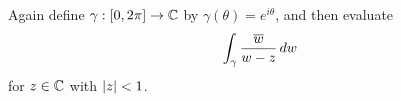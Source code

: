 \documentclass{homework}
\begin{document}
                                                                                      \begin{problem}
                                                                                        Again define $\gamma : [0,2\pi] \to \mathbb{C}$ by
                                                                                          $\gamma(\theta) = e^{i\theta}$, and then evaluate
                                                                                            \[
                                                                                                \int_\gamma \frac{\overline{w}}{w - z} \, dw
                                                                                                  \] for $z \in \mathbb{C}$ with $\left|z\right| < 1$.
                                                                                                  \end{problem}
\end{document}
